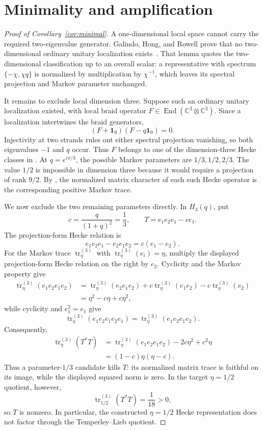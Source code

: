 \documentclass[11pt]{article}
\theoremstyle{remark}
\newcommand{\Id}{\mathbf 1}
\newcommand{\End}{\operatorname{End}}
\newcommand{\bbC}{\mathbb C}
\begin{document}
\section{Minimality and amplification}\label{sec:consequences}

\begin{proof}[Proof of Corollary~\ref{cor:minimal}]
A one-dimensional local space cannot carry the required two-eigenvalue
generator.  Galindo, Hong, and Rowell prove that no two-dimensional ordinary
unitary localization exists~\cite[Lemma 5.26]{GHR2013}.  That lemma quotes the
two-dimensional classification up to an overall scalar: a representative
with spectrum \(\{-\chi,\chi q\}\) is normalized by multiplication by
\(\chi^{-1}\), which leaves its spectral projection and Markov parameter
unchanged.

It remains to exclude local dimension three.  Suppose such an ordinary
unitary localization existed, with local braid operator
\(F\in\End(\bbC^3\otimes\bbC^3)\).  Since a localization intertwines the
braid generators,
\[
  (F+\Id_9)(F-q\Id_9)=0.
\]
Injectivity at two strands rules out either spectral projection vanishing,
so both eigenvalues \(-1\) and \(q\) occur.  Thus \(F\) belongs to one of the
dimension-three Hecke classes in
\cite[Theorem~3.4]{Lechner2026}.  At \(q=e^{i\pi/3}\), the possible Markov
parameters are \(1/3,1/2,2/3\).  The value \(1/2\) is impossible in dimension
three because it would require a projection of rank \(9/2\).  By
\cite[Lemma~3.1]{Lechner2026}, the normalized matrix character of each such
Hecke operator is the corresponding positive Markov trace.

We now exclude the two remaining parameters directly.  In \(H_3(q)\), put
\[
  c=\frac{q}{(1+q)^2}=\frac13,
  \qquad T=e_1e_2e_1-ce_1.
\]
The projection-form Hecke relation is
\[
  e_1e_2e_1-e_2e_1e_2=c(e_1-e_2).
\]
For the Markov trace \(\operatorname{tr}^{(3)}_\eta\) with
\(\operatorname{tr}^{(3)}_\eta(e_i)=\eta\), multiply the displayed
projection-form Hecke relation on the right by \(e_2\).  Cyclicity and the
Markov property give
\[
\begin{aligned}
  \operatorname{tr}^{(3)}_\eta(e_1e_2e_1e_2)
  &=\operatorname{tr}^{(3)}_\eta(e_2e_1e_2)
    +c\operatorname{tr}^{(3)}_\eta(e_1e_2)
    -c\operatorname{tr}^{(3)}_\eta(e_2)\\
  &=\eta^2-c\eta+c\eta^2,
\end{aligned}
\]
while cyclicity and \(e_1^2=e_1\) give
\[
  \operatorname{tr}^{(3)}_\eta(e_1e_2e_1e_2e_1)
  =\operatorname{tr}^{(3)}_\eta(e_1e_2e_1e_2).
\]
Consequently,
\[
\begin{aligned}
  \operatorname{tr}^{(3)}_\eta(T^*T)
  &=\operatorname{tr}^{(3)}_\eta(e_1e_2e_1e_2)
    -2c\eta^2+c^2\eta\\
  &=(1-c)\eta(\eta-c).
\end{aligned}
\]
Thus a parameter-\(1/3\) candidate kills \(T\): its normalized matrix trace
is faithful on its image, while the displayed squared norm is zero.  In the
target \(\eta=1/2\) quotient, however,
\[
  \operatorname{tr}^{(3)}_{1/2}(T^*T)=\frac1{18}>0,
\]
so \(T\) is nonzero.  In particular, the constructed \(\eta=1/2\) Hecke
representation does not factor through the Temperley--Lieb quotient.


\end{proof}
\end{document}
